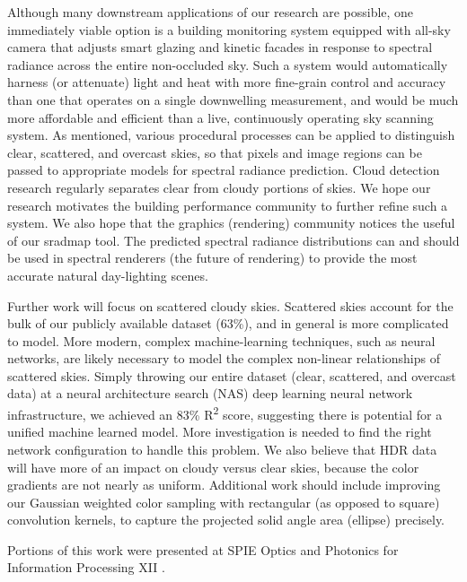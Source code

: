 Although many downstream applications of our research are possible, one immediately viable option is a building monitoring system equipped with all-sky camera that adjusts smart glazing and kinetic facades in response to spectral radiance across the entire non-occluded sky. Such a system would automatically harness (or attenuate) light and heat with more fine-grain control and accuracy than one that operates on a single downwelling measurement, and would be much more affordable and efficient than a live, continuously operating sky scanning system. As mentioned, various procedural processes can be applied to distinguish clear, scattered, and overcast skies, so that pixels and image regions can be passed to appropriate models for spectral radiance prediction. Cloud detection research regularly separates clear from cloudy portions of skies. We hope our research motivates the building performance community to further refine such a system. We also hope that the graphics (rendering) community notices the useful of our sradmap tool. The predicted spectral radiance distributions can and should be used in spectral renderers (the future of rendering) to provide the most accurate natural day-lighting scenes.

Further work will focus on scattered cloudy skies. Scattered skies account for the bulk of our publicly available dataset (63\%), and in general is more complicated to model. More modern, complex machine-learning techniques, such as neural networks, are likely necessary to model the complex non-linear relationships of scattered skies. Simply throwing our entire dataset (clear, scattered, and overcast data) at a neural architecture search (NAS) deep learning neural network infrastructure, we achieved an 83\% R\textsuperscript{2} score, suggesting there is potential for a unified machine learned model. More investigation is needed to find the right network configuration to handle this problem. We also believe that HDR data will have more of an impact on cloudy versus clear skies, because the color gradients are not nearly as uniform. Additional work should include improving our Gaussian weighted color sampling with rectangular (as opposed to square) convolution kernels, to capture the projected solid angle area (ellipse) precisely.

Portions of this work were presented at SPIE Optics and Photonics for Information Processing XII \citep{delrocco_spie}.
